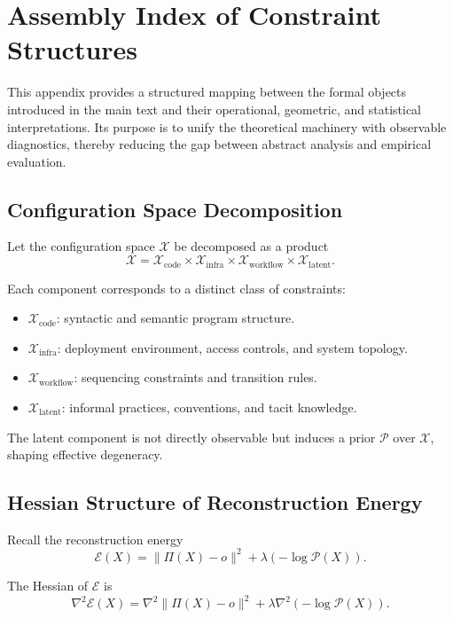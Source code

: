 \documentclass[12pt, oneside]{article}
\theoremstyle{plain}
\theoremstyle{definition}
\theoremstyle{remark}
\newcommand{\proj}{\Pi}
\newcommand{\energy}{\mathcal{E}}
\newcommand{\config}{\mathcal{X}}
\newcommand{\prior}{\mathcal{P}}
\begin{document}
\section{Assembly Index of Constraint Structures}

This appendix provides a structured mapping between the formal objects introduced
in the main text and their operational, geometric, and statistical interpretations.
Its purpose is to unify the theoretical machinery with observable diagnostics,
thereby reducing the gap between abstract analysis and empirical evaluation.

\subsection{Configuration Space Decomposition}

Let the configuration space $\config$ be decomposed as a product
\[
  \config = \config_{\text{code}} \times \config_{\text{infra}} \times \config_{\text{workflow}} \times \config_{\text{latent}}.
\]

Each component corresponds to a distinct class of constraints:

\begin{itemize}[leftmargin=2em]
\item $\config_{\text{code}}$: syntactic and semantic program structure.
\item $\config_{\text{infra}}$: deployment environment, access controls, and system topology.
\item $\config_{\text{workflow}}$: sequencing constraints and transition rules.
\item $\config_{\text{latent}}$: informal practices, conventions, and tacit knowledge.
\end{itemize}

The latent component is not directly observable but induces a prior $\prior$ over
$\config$, shaping effective degeneracy.

\subsection{Hessian Structure of Reconstruction Energy}

Recall the reconstruction energy
\[
  \energy(X) = \| \proj(X) - o \|^2 + \lambda (-\log \prior(X)).
\]

The Hessian of $\energy$ is
\[
  \nabla^2 \energy(X) = \nabla^2 \| \proj(X) - o \|^2 + \lambda \nabla^2 (-\log \prior(X)).
\]
\end{document}
